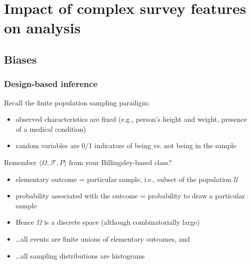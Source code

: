 \documentclass{beamer}
\begin{document}
\section{Impact of complex survey features on analysis}

\subsection{Biases}

\begin{frame}\frametitle{Design-based inference}

Recall the finite population sampling paradigm:
\begin{itemize}
    \item observed characteristics are fixed (e.g., person's height and weight, presence of a medical condition)
    \item random variables are 0/1 indicators of being vs. not being in the sample
\end{itemize}

Remember $\langle \Omega, \mathcal{F}, P \rangle$ from your Billingsley-based class?
\begin{itemize}
    \item elementary outcome = particular sample, i.e., subset of the population $\mathcal U$
    \item probability associated with the outcome = probability to draw a particular sample
    \item Hence $\Omega$ is a discrete space (although combinatorially large)
    \item \ldots all events are finite unions of elementary outcomes, and
    \item \ldots all sampling distributions are histograms
\end{itemize}

\end{frame}
\end{document}
